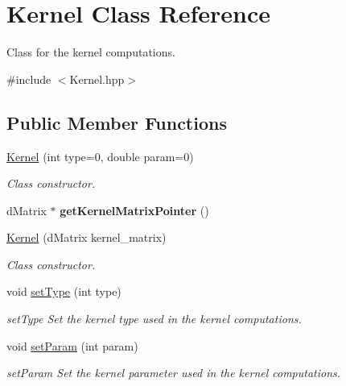 \hypertarget{class_kernel}{}\section{Kernel Class Reference}
\label{class_kernel}


Class for the kernel computations.  




{\ttfamily \#include $<$Kernel.\+hpp$>$}

\subsection*{Public Member Functions}
\begin{DoxyCompactItemize}
\item 
\mbox{\label{class_kernel_ae60e072c58cdc16842a239bdd0761590}} 
\hyperlink{class_kernel_ae60e072c58cdc16842a239bdd0761590}{Kernel} (int type=0, double param=0)
\begin{DoxyCompactList}\small\item\em Class constructor. \end{DoxyCompactList}\item 
\mbox{\label{class_kernel_a4dc45b11849fada00d52060cee27730b}} 
d\+Matrix $\ast$ {\bfseries get\+Kernel\+Matrix\+Pointer} ()
\item 
\hyperlink{class_kernel_adf23c1567adb8ddb5757931587320871}{Kernel} (d\+Matrix kernel\+\_\+matrix)
\begin{DoxyCompactList}\small\item\em Class constructor. \end{DoxyCompactList}\item 
void \hyperlink{class_kernel_ad01e209470accf44ea240078f39fb127}{set\+Type} (int type)
\begin{DoxyCompactList}\small\item\em set\+Type Set the kernel type used in the kernel computations. \end{DoxyCompactList}\item 
void \hyperlink{class_kernel_a4fe711ebdbc168be1733fbb8aea6cf92}{set\+Param} (int param)
\begin{DoxyCompactList}\small\item\em set\+Param Set the kernel parameter used in the kernel computations. \end{DoxyCompactList}\item 

\end{DoxyCompactItemize}
